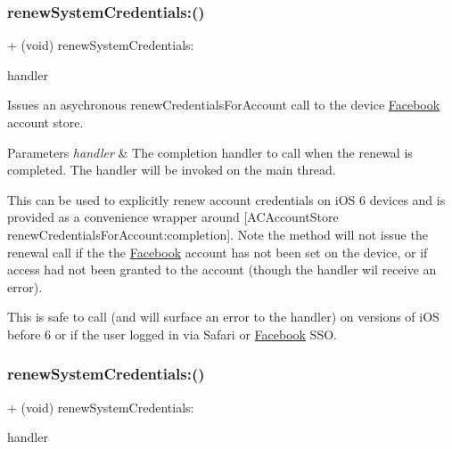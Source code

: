 \subsubsection{\texorpdfstring{renew\+System\+Credentials\+:()}{renewSystemCredentials:()}\hspace{0.1cm}{\footnotesize\ttfamily [1/5]}}
{\footnotesize\ttfamily + (void) renew\+System\+Credentials\+: \begin{DoxyParamCaption}\item[{(F\+B\+Session\+Renew\+System\+Credentials\+Handler)}]{handler }\end{DoxyParamCaption}}

Issues an asychronous renew\+Credentials\+For\+Account call to the device \hyperlink{interfaceFacebook}{Facebook} account store.


\begin{DoxyParams}{Parameters}
{\em handler} & The completion handler to call when the renewal is completed. The handler will be invoked on the main thread.\\
\hline
\end{DoxyParams}
This can be used to explicitly renew account credentials on i\+OS 6 devices and is provided as a convenience wrapper around {\ttfamily \mbox{[}A\+C\+Account\+Store renew\+Credentials\+For\+Account\+:completion\mbox{]}}. Note the method will not issue the renewal call if the the \hyperlink{interfaceFacebook}{Facebook} account has not been set on the device, or if access had not been granted to the account (though the handler wil receive an error).

This is safe to call (and will surface an error to the handler) on versions of i\+OS before 6 or if the user logged in via Safari or \hyperlink{interfaceFacebook}{Facebook} S\+SO. \mbox{\label{interfaceFBSession_a3b4d7c16af36ea5690d19bf77065dfaf}} 
\subsubsection{\texorpdfstring{renew\+System\+Credentials\+:()}{renewSystemCredentials:()}\hspace{0.1cm}{\footnotesize\ttfamily [2/5]}}
{\footnotesize\ttfamily + (void) renew\+System\+Credentials\+: \begin{DoxyParamCaption}\item[{(F\+B\+Session\+Renew\+System\+Credentials\+Handler)}]{handler }\end{DoxyParamCaption}}

